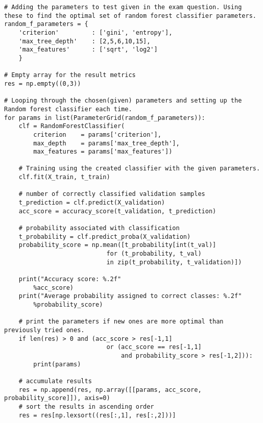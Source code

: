 \begin{verbatim}
# Adding the parameters to test given in the exam question. Using these to find the optimal set of random forest classifier parameters.
random_f_parameters = {
    'criterion'         : ['gini', 'entropy'],
    'max_tree_depth'    : [2,5,6,10,15],
    'max_features'      : ['sqrt', 'log2']
    }

# Empty array for the result metrics
res = np.empty((0,3)) 

# Looping through the chosen(given) parameters and setting up the Random forest classifier each time.
for params in list(ParameterGrid(random_f_parameters)):
    clf = RandomForestClassifier(
        criterion    = params['criterion'],
        max_depth    = params['max_tree_depth'],
        max_features = params['max_features'])

    # Training using the created classifier with the given parameters.
    clf.fit(X_train, t_train)

    # number of correctly classified validation samples
    t_prediction = clf.predict(X_validation)
    acc_score = accuracy_score(t_validation, t_prediction)

    # probability associated with classification
    t_probability = clf.predict_proba(X_validation)
    probability_score = np.mean([t_probability[int(t_val)]
                            for (t_probability, t_val)
                            in zip(t_probability, t_validation)])

    print("Accuracy score: %.2f"
        %acc_score)
    print("Average probability assigned to correct classes: %.2f"
        %probability_score)

    # print the parameters if new ones are more optimal than previously tried ones.
    if len(res) > 0 and (acc_score > res[-1,1]
                            or (acc_score == res[-1,1]
                                and probability_score > res[-1,2])):
        print(params)

    # accumulate results
    res = np.append(res, np.array([[params, acc_score, probability_score]]), axis=0)
    # sort the results in ascending order
    res = res[np.lexsort((res[:,1], res[:,2]))] 
\end{verbatim}


